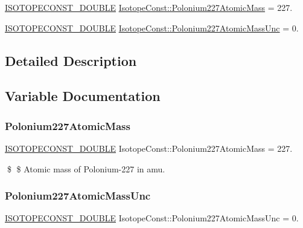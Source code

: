 \begin{DoxyCompactItemize}
\item 
\mbox{\hyperlink{group___isotope_const-_macros_ga8f45a7272ce02c0b4c65c44636ed719a}{I\+S\+O\+T\+O\+P\+E\+C\+O\+N\+S\+T\+\_\+\+D\+O\+U\+B\+LE}} \mbox{\hyperlink{group___isotope_const-_polonium-_po227_ga3ca743bf33bba40c12f479cf0a56d5b5}{Isotope\+Const\+::\+Polonium227\+Atomic\+Mass}} = 227.
\item 
\mbox{\hyperlink{group___isotope_const-_macros_ga8f45a7272ce02c0b4c65c44636ed719a}{I\+S\+O\+T\+O\+P\+E\+C\+O\+N\+S\+T\+\_\+\+D\+O\+U\+B\+LE}} \mbox{\hyperlink{group___isotope_const-_polonium-_po227_gad270a375267f3afcc5084ec5d231179d}{Isotope\+Const\+::\+Polonium227\+Atomic\+Mass\+Unc}} = 0.
\end{DoxyCompactItemize}


\subsection{Detailed Description}


\subsection{Variable Documentation}
\mbox{\label{group___isotope_const-_polonium-_po227_ga3ca743bf33bba40c12f479cf0a56d5b5}} 
\subsubsection{\texorpdfstring{Polonium227\+Atomic\+Mass}{Polonium227AtomicMass}}
{\footnotesize\ttfamily \mbox{\hyperlink{group___isotope_const-_macros_ga8f45a7272ce02c0b4c65c44636ed719a}{I\+S\+O\+T\+O\+P\+E\+C\+O\+N\+S\+T\+\_\+\+D\+O\+U\+B\+LE}} Isotope\+Const\+::\+Polonium227\+Atomic\+Mass = 227.}

\$ \$ Atomic mass of Polonium-\/227 in amu. \mbox{\label{group___isotope_const-_polonium-_po227_gad270a375267f3afcc5084ec5d231179d}} 
\subsubsection{\texorpdfstring{Polonium227\+Atomic\+Mass\+Unc}{Polonium227AtomicMassUnc}}
{\footnotesize\ttfamily \mbox{\hyperlink{group___isotope_const-_macros_ga8f45a7272ce02c0b4c65c44636ed719a}{I\+S\+O\+T\+O\+P\+E\+C\+O\+N\+S\+T\+\_\+\+D\+O\+U\+B\+LE}} Isotope\+Const\+::\+Polonium227\+Atomic\+Mass\+Unc = 0.}


